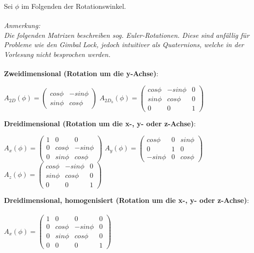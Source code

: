 Sei $\phi$ im Folgenden der Rotationswinkel.\\\\
\textit{Anmerkung:\\Die folgenden Matrizen beschreiben sog. Euler-Rotationen. Diese sind anfällig für Probleme wie den Gimbal Lock, jedoch intuitiver als Quaternions, welche in der Vorlesung nicht besprochen werden.}\\\\
\textbf{Zweidimensional (Rotation um die y-Achse)}:
\begin{center}
	$A_{2D}(\phi) = \begin{pmatrix}cos \phi & -sin \phi \\ sin \phi & cos \phi\end{pmatrix}$\hspace*{0.5cm}
	$A_{2D_h}(\phi) = \begin{pmatrix}cos \phi & -sin \phi & 0 \\ sin \phi & cos \phi & 0 \\ 0 & 0 & 1\end{pmatrix}$\vspace*{0.25cm}
\end{center}
\textbf{Dreidimensional (Rotation um die x-, y- oder z-Achse)}:
\begin{center}
	$A_{x}(\phi) = \begin{pmatrix}1 & 0 & 0\\ 0 & cos \phi & -sin \phi\\ 0 & sin \phi & cos \phi \end{pmatrix}$\hfill
	$A_{y}(\phi) = \begin{pmatrix}cos \phi & 0 & sin \phi\\0 & 1 & 0\\-sin \phi & 0 & cos \phi\end{pmatrix}$\hfill
	$A_{z}(\phi) = \begin{pmatrix}cos \phi & -sin \phi & 0\\ sin \phi & cos \phi & 0 \\ 0 & 0 & 1\end{pmatrix}$\vspace*{0.25cm}\\
\end{center}
\textbf{Dreidimensional, homogenisiert (Rotation um die x-, y- oder z-Achse)}:\\\\
$A_{x}(\phi) = \begin{pmatrix}1 & 0 & 0 & 0\\ 0 & cos \phi & -sin \phi& 0\\ 0 & sin \phi & cos \phi & 0\\ 0 & 0 & 0 & 1\end{pmatrix}$

